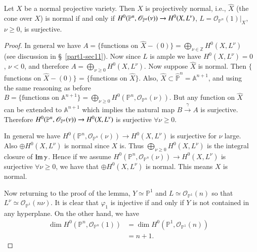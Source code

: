 {\begin{sublemma}\label{part1-sublem13.1}
Let $X$ be a normal projective variety. Then $X$ is\pageoriginale
projectively normal, i.e., $\hat{X}$ (the cone over $X$) is normal if
and only if
$H^{0}(\mathbb{P}^{n},\break\mathscr{O}_{\mathbb{P}^{n}}(\nu))\to
H^{0}(X,L^{\nu})$, $L=\mathscr{O}_{\mathbb{P}^{n}}(1)|_{X}$, $\nu\geq
0$, is surjective.
\end{sublemma}

\begin{proof}
In general we have $A=\{\text{functions
  on~}\hat{X}-(0)\}=\bigoplus\limits_{\nu\in\mathbb{Z}}H^{0}(X,L^{\nu})$
(see discussion in \S\ \ref{part1-sec11}). Now since $L$ is ample we
have $H^{0}(X,L^{\nu})=0$, $\nu<0$, and therefore
$A=\bigoplus\limits_{\nu\geq 0}H^{0}(X,L^{\nu})$. Now suppose
$\hat{X}$ is normal. Then $\{$functions on $\hat{X}-(0)\}$ =
$\{$functions on $\hat{X}\}$. Also, $\hat{X}\subset
\hat{\mathbb{P}}^{n}=\mathbb{A}^{n+1}$, and using the same reasoning
as before $B=\{\text{functions on~}
\mathbb{A}^{n+1}\}=\bigoplus\limits_{\nu\geq
  0}H^{0}(\mathbb{P}^{n},\mathscr{O}_{\mathbb{P}^{n}}(\nu))$. But any
function on $\hat{X}$ can be extended to $\mathbb{A}^{n+1}$ which
implies the natural map $B\xrightarrow{\gamma}A$ is
surjective. Therefore
$H^{0}(\mathbb{P}^{n},\break\mathscr{O}_{\mathbb{P}^{n}}(\nu))\to
H^{0}(X,L^{\nu})$ is surjective $\forall \nu\geq 0$.

In general we have
$H^{0}(\mathbb{P}^{n},\mathscr{O}_{\mathbb{P}^{n}}(\nu))\to
H^{0}(X,L^{\nu})$ is surjective for $\nu$ large. Also $\oplus
H^{0}(X,L^{\nu})$ is normal since $X$ is. Thus
$\bigoplus\limits_{\nu\geq 0}H^{0}(X,L^{\nu})$ is the integral closure
of $\operatorname{Im} \gamma$. Hence if we assume
$H^{0}(\mathbb{P}^{n},\mathscr{O}_{\mathbb{P}^{n}}(\nu))\to
H^{0}(X,L^{\nu})$ is surjective $\forall \nu\geq 0$, we have that
$\oplus H^{0}(X,L^{\nu})$ is normal. This means $X$ is normal.

Now returning to the proof of the lemma, $Y\simeq \mathbb{P}^{1}$ and
$L\simeq \mathscr{O}_{\mathbb{P}^{1}}(n)$ so that $L^{\nu}\simeq
\mathscr{O}_{\mathbb{P}^{1}}(n\nu)$. It is clear that $\varphi_{1}$ is
injective if and only if $Y$ is not contained in any hyperplane. On
the other hand, we have
\begin{align*}
\dim H^{0}(\mathbb{P}^{n},\mathscr{O}_{\mathbb{P}^{n}}(1)) &=\dim
H^{0}(\mathbb{P}^{1},\mathscr{O}_{\mathbb{P}^{1}}(n))\\
&= n+1.
\end{align*}


\end{proof}}
